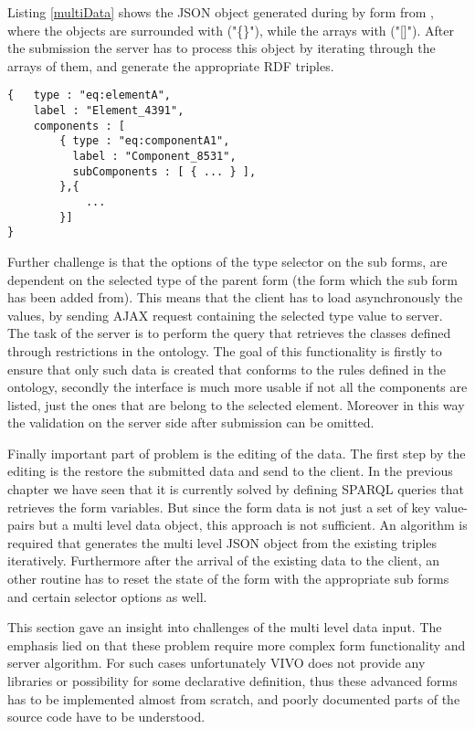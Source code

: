 Listing \ref{multiData} shows the JSON object generated during by form from , where the objects are surrounded with ("\{\}"), while the arrays with ("[]"). After the submission the server has to process this object by iterating through the arrays of them, and generate the appropriate RDF triples.

\begin{lstlisting}[basicstyle=\footnotesize, frame=single, caption={Multi level form data in JSON}, label=multiData, captionpos=b, belowskip=1em, aboveskip=2em]
{	type : "eq:elementA",
	label : "Element_4391",
	components : [
		{ type : "eq:componentA1",
		  label : "Component_8531",	
		  subComponents : [ { ... } ],
		},{ 
			... 
		}]
}
\end{lstlisting}

Further challenge is that the options of the type selector on the sub forms, are dependent on the selected type of the parent form (the form which the sub form has been added from). This means that the client has to load asynchronously the values, by sending AJAX request containing the selected type value to server. The task of the server is to perform the query that retrieves the classes defined through restrictions in the ontology. The goal of this functionality is firstly to ensure that only such data is created that conforms to the rules defined in the ontology, secondly the interface is much more usable if not all the components are listed, just the ones that are belong to the selected element. Moreover in this way the validation on the server side after submission can be omitted.

Finally important part of problem is the editing of the data. The first step by the editing is the restore the submitted data and send to the client. In the previous chapter we have seen that it is currently solved by defining  SPARQL queries that retrieves the form variables. But since the form data is not just a set of key value-pairs but a multi level data object, this approach is not sufficient. An algorithm is required that generates the multi level JSON object from the existing triples iteratively. Furthermore after the arrival of the existing data to the client, an other routine has to reset the state of the form with the appropriate sub forms and certain selector options as well.

This section gave an insight into challenges of the multi level data input. The emphasis lied on that these problem require more complex form functionality and server algorithm. For such cases unfortunately VIVO does not provide any libraries or possibility for some declarative definition, thus these advanced forms has to be implemented almost from scratch, and poorly documented parts of the source code have to be understood.

